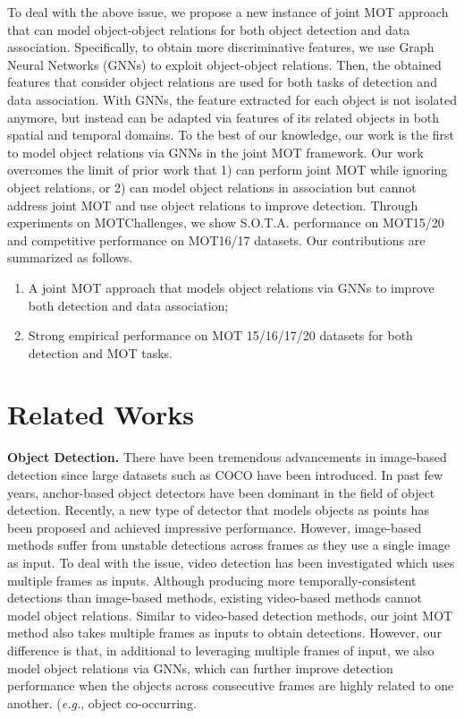 \documentclass[letterpaper, 10 pt, conference]{ieeeconf}
\begin{document}
To deal with the above issue, we propose a new instance of joint MOT approach that can model object-object relations for both object detection and data association. Specifically, to obtain more discriminative features, we use Graph Neural Networks (GNNs) to exploit object-object relations. Then, the obtained features that consider object relations are used for both tasks of detection and data association. With GNNs, the feature extracted for each object is not isolated anymore, but instead can be adapted via features of its related objects in both spatial and temporal domains. To the best of our knowledge, our work is the first to model object relations via GNNs in the joint MOT framework. Our work overcomes the limit of prior work that 1) can perform joint MOT while ignoring object relations, or 2) can model object relations in association but cannot address joint MOT and use object relations to improve detection. Through experiments on MOTChallenges, we show S.O.T.A. performance on MOT15/20 and competitive performance on MOT16/17 datasets. Our contributions are summarized as follows. 
\begin{enumerate}
    \item A joint MOT approach that models object relations via GNNs to improve both detection and data association;
    \item Strong empirical performance on MOT 15/16/17/20 datasets for both detection and MOT tasks.
\end{enumerate}
 
\section{Related Works}

\noindent\textbf{Object Detection.} There have been tremendous advancements in image-based detection since large datasets such as COCO \cite{Lin2014} have been introduced. In past few years, anchor-based object detectors \cite{Ren2015, Liu2016, He2017, Redmon2016} have been dominant in the field of object detection. Recently, a new type of detector that models objects as points has been proposed \cite{Zhou2019, Law2018} and achieved impressive performance. However, image-based methods suffer from unstable detections across frames as they use a single image as input.  To deal with the issue, video  detection \cite{Zhu2018, Ramzy2019, Xiao2018} has been investigated which uses multiple frames as inputs. Although producing more temporally-consistent detections than image-based methods, existing video-based methods cannot model object relations. Similar to video-based detection methods, our joint MOT method also takes multiple frames as inputs to obtain detections. However,  our difference is that, in additional to leveraging multiple frames of input, we also model object relations via GNNs, which can further improve detection performance when the objects across consecutive frames are highly related to one another. (\emph{e.g.}, object co-occurring.
\end{document}
